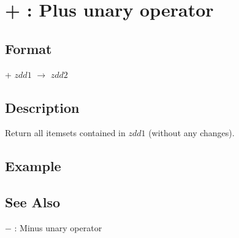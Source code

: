 
\section{+ : Plus unary operator\label{sect:plus_op}}
\subsection*{Format}
+ $zdd1$ $\rightarrow$ $zdd2$

\subsection*{Description}
Return all itemsets contained in $zdd1$ (without any changes). 

\subsection*{Example}


\subsection*{See Also}
\hyperref[sect:minus_op]{$-$} : Minus unary operator

